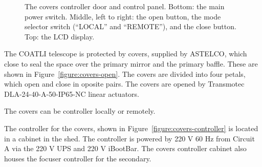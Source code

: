 \begin{figure}
\begin{center}
\end{center}
\caption{The covers controller door and control panel. Bottom: the main power switch. Middle, left to right: the open button, the mode selector switch (“LOCAL” and “REMOTE”), and the close button. Top: the LCD display.}
\label{figure:covers-controller-door}
\end{figure}

The COATLI telescope is protected by covers, supplied by ASTELCO, which close to seal the space over the primary mirror and the primary baffle. These are shown in Figure~\ref{figure:covers-open}. The covers are divided into four petals, which open and close in oposite pairs. The covers are opened by Transmotec DLA-24-40-A-50-IP65-NC linear actuators.

The covers can be controller locally or remotely.

The controller for the covers, shown in Figure~\ref{figure:covers-controller} is located in a cabinet in the shed. The controller is powered by 220 V 60 Hz from Circuit A via the 220 V UPS and 220 V iBootBar. The covers controller cabinet also houses the focuser controller for the secondary.

